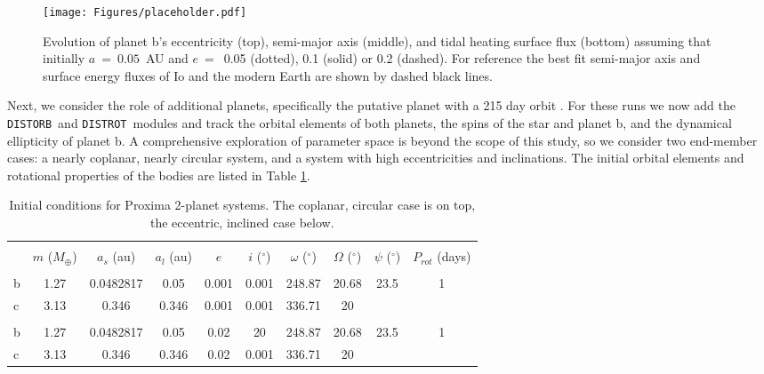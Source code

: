 \documentclass[preprint,12pt]{aastex}
\def\distorb{\texttt{\footnotesize{DISTORB}}\xspace}
\def\distrot{\texttt{\footnotesize{DISTROT}}\xspace}
\begin{document}
\begin{figure} 
\begin{center}
\texttt{[image: Figures/placeholder.pdf]}
\end{center}
\caption{Evolution of planet b's eccentricity (top), semi-major axis
  (middle), and tidal heating surface flux (bottom) assuming that
  initially $a~=~0.05$~AU and $e~=$~0.05 (dotted), 0.1 (solid) or 0.2
  (dashed). For reference the best fit semi-major axis and surface
  energy fluxes of Io and the modern Earth are shown by dashed black
  lines.}
\label{fig:eqtide}
\end{figure}

Next, we consider the role of additional planets, specifically the
putative planet with a 215 day orbit \citep{AngladaEscude16}. For
these runs we now add the \distorb~and \distrot~modules and track the
orbital elements of both planets, the spins of the star and planet b,
and the dynamical ellipticity of planet b. A comprehensive exploration
of parameter space is beyond the scope of this study, so we consider
two end-member cases: a nearly coplanar, nearly circular system, and a
system with high eccentricities and inclinations. The initial orbital
elements and rotational properties of the bodies are listed in Table
\ref{tab:orbitic}.

\begin{table}[h]
\centering
\begin{tabular}{lccccccccc}
\hline\hline \\[-1.5ex]
& $m$ ($M_{\oplus}$)  & $a_s$ (au) & $a_l$ (au) & $e$ & $i$ ($^{\circ}$)
 & $\omega$ ($^{\circ}$) & $\Omega$ ($^{\circ}$) & $\psi$ ($^{\circ}$) & 
 $P_{rot}$ (days)\\[0.5ex]
\hline \\ [-1.5ex]
b & 1.27 & 0.0482817 & 0.05 & 0.001 & 0.001 & 248.87 & 20.68 & 23.5 & 1  \\
c & 3.13 & 0.346 & 0.346 & 0.001 & 0.001 & 336.71 & 20 & &  \\
\hline \\
b & 1.27 & 0.0482817 & 0.05 & 0.02 & 20 & 248.87 & 20.68 & 23.5 & 1  \\
c & 3.13 & 0.346 & 0.346 & 0.02 & 0.001 & 336.71 & 20 & &  \\
\end{tabular}
\caption{Initial conditions for Proxima 2-planet systems. The coplanar, 
  circular case is on top, the eccentric, inclined case below.}
\label{tab:orbitic}
\end{table}
\end{document}
